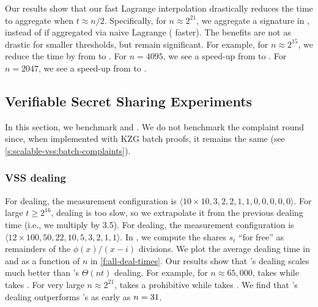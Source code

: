 Our results show that our fast Lagrange interpolation drastically reduces the time to aggregate when $t\approx n/2$.
Specifically, for $n\approx 2^{21}$, we aggregate a signature in , instead of  if aggregated via naive Lagrange ( faster).
The benefits are not as drastic for smaller thresholds, but remain significant.
For example, for $n\approx 2^{15}$, we reduce the time by  from  to .
For $n=4095$, we see a  speed-up from  to .
For $n=2047$, we see a  speed-up from  to .

\subsection{Verifiable Secret Sharing Experiments}
\label{s:eval:vss}
In this section, we benchmark \evss and \ourvss.
We do not benchmark the complaint round since, when implemented with KZG batch proofs, it remains the same (see \cref{s:scalable-vss:batch-complaints}).

\subsubsection{VSS dealing}
\label{s:eval:vss:deal}
For \evss dealing, the measurement configuration is $\langle 10 \times 10, 3, 2, 2, 1, 1, 0, 0, 0, 0, 0\rangle$.
For large $t\ge 2^{16}$, \evss dealing is too slow, so we extrapolate it from the previous dealing time (i.e., we multiply by 3.5).
For \ourvss dealing, the measurement configuration is $\langle12 \times 100, 50, 22, 10, 5, 3, 2, 1, 1\rangle$.
In \evss, we compute the shares $s_i$ ``for free'' as remainders of the $\phi(x) / (x-i)$ divisions.
We plot the average dealing time in \ourvss and \evss as a function of $n$ in \cref{f:all-deal-times}.
Our results show that \ourvss's \amtDealTime dealing scales much better than \evss's $\Theta(nt)$ dealing.
For example, for $n\approx 65,000$, \evss takes  while \ourvss takes .
For very large $n\approx 2^{21}$, \evss takes a prohibitive  while \ourvss takes .
We find that \ourvss's dealing outperforms \evss's as early as $n=31$.

